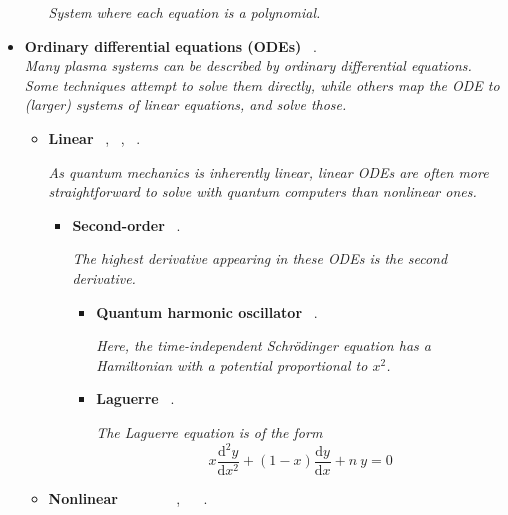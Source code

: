 \documentclass[12pt,letterpaper]{article}
\begin{document}
\begin{itemize}
\begin{itemize}
            \emph{System where each equation is a polynomial.}
		\end{itemize}
  
	\item \textbf{Ordinary differential equations (ODEs)}  ~\cite{zangerQuantumAlgorithmsSolving2021}.
    \\\emph{Many plasma systems can be described by ordinary differential equations. Some techniques attempt to solve them directly, while others map the ODE to (larger) systems of linear equations, and solve those.}
		\begin{itemize} 
			\item \textbf{Linear}  ~\cite{berryHighorderQuantumAlgorithm2014,berryQuantumAlgorithmLinear2017,childsQuantumSpectralMethods2020,fangTimemarchingBasedQuantum2022,jinQuantumSimulationPartial2022}, ~\cite{jinQuantumSimulationPartial2022a},  ~\cite{zangerQuantumAlgorithmsSolving2021}.

            \textit{As quantum mechanics is inherently linear, linear ODEs are often more straightforward to solve with quantum computers than nonlinear ones.}
            
				\begin{itemize} 
					\item \textbf{Second-order}  ~\cite{srivastavaBoxAlgorithmSolution2019}.

                    \textit{The highest derivative appearing in these ODEs is the second derivative.}
                    
                    \begin{itemize} 
                        \item \textbf{Quantum harmonic oscillator}  ~\cite{ricardoAlternativesNonhomogeneousPartial2022}.

                        \textit{Here, the time-independent Schrödinger equation has a Hamiltonian with a potential proportional to $x^2$.}

                        \item \textbf{Laguerre}  ~\cite{criadoQadeSolvingDifferential2022}.

                        \textit{The Laguerre equation is of the form $$ x \dfrac{\mathrm{d}^2 y}{\mathrm{d} x^2} + (1-x) \dfrac{\mathrm{d} y}{\mathrm{d} x} + n ~y = 0$$
                        }
                    \end{itemize}
				\end{itemize}
			\item \textbf{Nonlinear} ~ ~\cite{kyriienkoSolvingNonlinearDifferential2021, shiSimulatingNonnativeCubic2021} ~ ~\cite{leytonQuantumAlgorithmSolve2008,dodinQuantumComputationNonlinear2021,lloydQuantumAlgorithmNonlinear2020} ~\cite{jinQuantumSimulationPartial2022a,liuEfficientQuantumAlgorithm2021,suranaCarlemanLinearizationBased2022b}, ~ ~\cite{zangerQuantumAlgorithmsSolving2021}.


\end{itemize}
\end{itemize}
\end{document}
